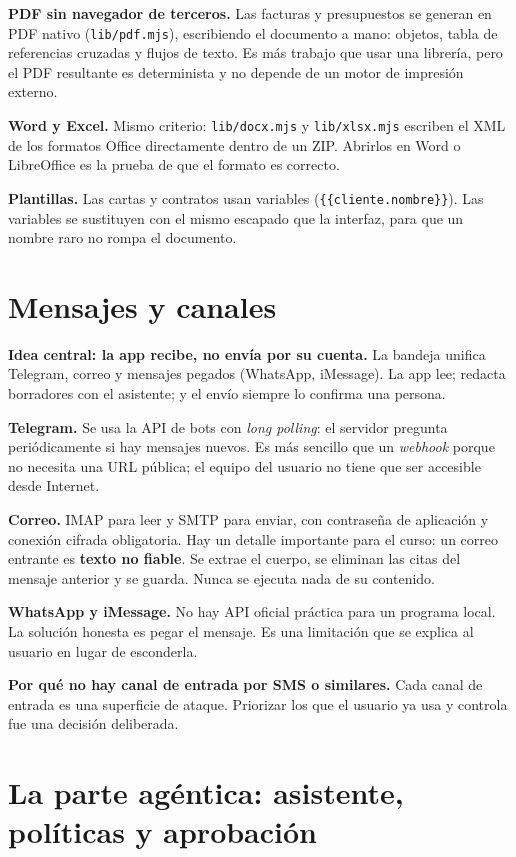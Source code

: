 \textbf{PDF sin navegador de terceros.} Las facturas y presupuestos se generan en PDF nativo (\texttt{lib/pdf.mjs}), escribiendo el documento a mano: objetos, tabla de referencias cruzadas y flujos de texto. Es más trabajo que usar una librería, pero el PDF resultante es determinista y no depende de un motor de impresión externo.

\textbf{Word y Excel.} Mismo criterio: \texttt{lib/docx.mjs} y \texttt{lib/xlsx.mjs} escriben el XML de los formatos Office directamente dentro de un ZIP. Abrirlos en Word o LibreOffice es la prueba de que el formato es correcto.

\textbf{Plantillas.} Las cartas y contratos usan variables (\texttt{\{\{cliente.nombre\}\}}). Las variables se sustituyen con el mismo escapado que la interfaz, para que un nombre raro no rompa el documento.

\chapter{Mensajes y canales}\label{mensajes-y-canales}

\textbf{Idea central: la app recibe, no envía por su cuenta.} La bandeja unifica Telegram, correo y mensajes pegados (WhatsApp, iMessage). La app lee; redacta borradores con el asistente; y el envío siempre lo confirma una persona.

\textbf{Telegram.} Se usa la API de bots con \emph{long polling}: el servidor pregunta periódicamente si hay mensajes nuevos. Es más sencillo que un \emph{webhook} porque no necesita una URL pública; el equipo del usuario no tiene que ser accesible desde Internet.

\textbf{Correo.} IMAP para leer y SMTP para enviar, con contraseña de aplicación y conexión cifrada obligatoria. Hay un detalle importante para el curso: un correo entrante es \textbf{texto no fiable}. Se extrae el cuerpo, se eliminan las citas del mensaje anterior y se guarda. Nunca se ejecuta nada de su contenido.

\textbf{WhatsApp y iMessage.} No hay API oficial práctica para un programa local. La solución honesta es pegar el mensaje. Es una limitación que se explica al usuario en lugar de esconderla.

\textbf{Por qué no hay canal de entrada por SMS o similares.} Cada canal de entrada es una superficie de ataque. Priorizar los que el usuario ya usa y controla fue una decisión deliberada.

\chapter{La parte agéntica: asistente, políticas y aprobación}\label{cap:agentica}\label{la-parte-aguxe9ntica-asistente-poluxedticas-y-aprobaciuxf3n}

